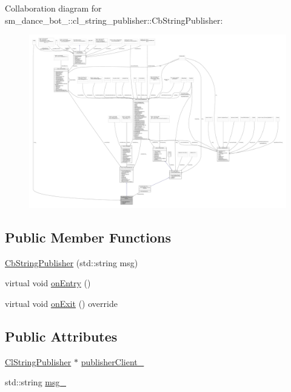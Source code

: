 Collaboration diagram for sm\+\_\+dance\+\_\+bot\+\_\+:\+:cl\+\_\+string\+\_\+publisher\+:\+:Cb\+String\+Publisher\+:
\nopagebreak
\begin{figure}[H]
\begin{center}
\leavevmode
\includegraphics[width=350pt]{classsm__dance__bot__3_1_1cl__string__publisher_1_1CbStringPublisher__coll__graph}
\end{center}
\end{figure}
\subsection*{Public Member Functions}
\begin{DoxyCompactItemize}
\item 
\hyperlink{classsm__dance__bot__3_1_1cl__string__publisher_1_1CbStringPublisher_a3f0366d15c3bb9a4c244bd390a55ce33}{Cb\+String\+Publisher} (std\+::string msg)
\item 
virtual void \hyperlink{classsm__dance__bot__3_1_1cl__string__publisher_1_1CbStringPublisher_a4e4621380a2e055f746e6fdae5637731}{on\+Entry} ()
\item 
virtual void \hyperlink{classsm__dance__bot__3_1_1cl__string__publisher_1_1CbStringPublisher_a7a110784e275e8726246d7ec08b2df45}{on\+Exit} () override
\end{DoxyCompactItemize}
\subsection*{Public Attributes}
\begin{DoxyCompactItemize}
\item 
\hyperlink{classsm__dance__bot__3_1_1cl__string__publisher_1_1ClStringPublisher}{Cl\+String\+Publisher} $\ast$ \hyperlink{classsm__dance__bot__3_1_1cl__string__publisher_1_1CbStringPublisher_a0ad09eb431850dcefcb364904d56e6eb}{publisher\+Client\+\_\+}
\item 
std\+::string \hyperlink{classsm__dance__bot__3_1_1cl__string__publisher_1_1CbStringPublisher_a2a5852f61ef2db0fa430b4fcc00ce2c3}{msg\+\_\+}
\end{DoxyCompactItemize}


